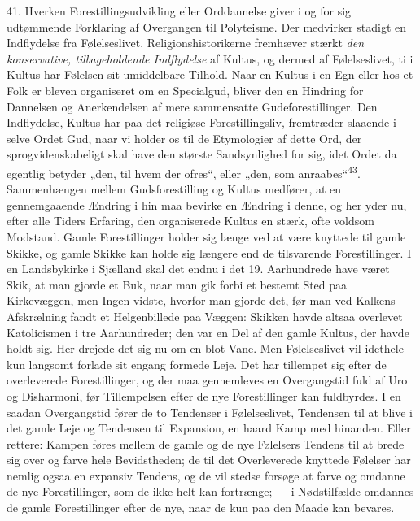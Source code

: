 \documentclass[12pt,a4paper,openany]{book}
\newcommand{\opage}[1]{\marginnote{\footnotesize\textit{[#1]}}}
\begin{document}
41. Hverken Forestillingsudvikling eller Orddannelse giver i og for sig
udtømmende Forklaring af Overgangen til Polyteisme. Der medvirker
stadigt en Indflydelse fra Følelseslivet. Religionshistorikerne
fremhæver stærkt \textit{den konservative, tilbageholdende Indflydelse}
af Kultus, og dermed af Følelseslivet, ti i Kultus har Følelsen sit
umiddelbare Tilhold. Naar en Kultus i en Egn eller hos et Folk er bleven
organiseret om en Specialgud, bliver den en Hindring for Dannelsen og
Anerkendelsen af mere sammensatte Gudeforestillinger. Den Indflydelse,
Kultus har paa det religiøse Forestillingsliv, fremtræder slaaende i
selve Ordet Gud, naar vi holder os til de Etymologier af dette Ord, der
sprogvidenskabeligt skal have den største Sandsynlighed for sig, idet
Ordet da egentlig betyder „den, til hvem der ofres“, eller „den, som
anraabes“\textsuperscript{43}. Sammenhængen mellem Gudsforestilling og
Kultus medfører, at en gennemgaaende Ændring i hin maa bevirke en
Ændring i denne, og her yder nu, efter alle Tiders Erfaring, den
organiserede Kultus en stærk, ofte voldsom Modstand. Gamle
Forestillinger holder sig længe ved at være knyttede til gamle Skikke,
og gamle Skikke kan holde sig længere end de tilsvarende Forestillinger.
I en Landsbykirke i Sjælland skal det endnu i det 19. Aarhundrede have
været Skik, at man gjorde et Buk, naar man gik forbi et bestemt Sted paa
Kirkevæggen, men Ingen vidste, hvorfor man gjorde det, før man ved
Kalkens Afskrælning fandt et Helgenbillede paa Væggen: Skikken havde
altsaa overlevet Katolicismen i tre Aarhundreder; den var en Del af den
gamle Kultus, der havde holdt sig. Her drejede det sig nu om en blot
\opage{96}Vane. Men Følelseslivet vil idethele kun langsomt forlade sit
engang formede Leje. Det har tillempet sig efter de overleverede
Forestillinger, og der maa gennemleves en Overgangstid fuld af Uro og
Disharmoni, før Tillempelsen efter de nye Forestillinger kan fuldbyrdes.
I en saadan Overgangstid fører de to Tendenser i Følelseslivet,
Tendensen til at blive i det gamle Leje og Tendensen til Expansion, en
haard Kamp med hinanden. Eller rettere: Kampen føres mellem de gamle og
de nye Følelsers Tendens til at brede sig over og farve hele
Bevidstheden; de til det Overleverede knyttede Følelser har nemlig ogsaa
en expansiv Tendens, og de vil stedse forsøge at farve og omdanne de nye
Forestillinger, som de ikke helt kan fortrænge; --- i Nødstilfælde
omdannes de gamle Forestillinger efter de nye, naar de kun paa den Maade
kan bevares.
\end{document}
